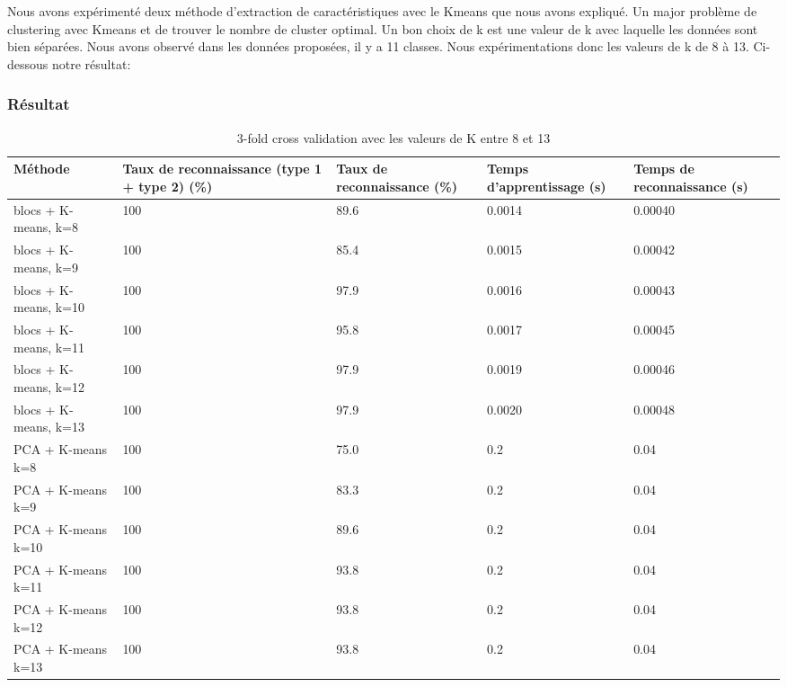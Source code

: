 \documentclass[french,12pt,a4paper,oneside,notitlepage]{report}
\begin{document}
Nous avons expérimenté deux méthode d'extraction de caractéristiques avec le Kmeans que nous avons expliqué. Un major problème de clustering avec Kmeans et de trouver le nombre de cluster optimal. Un bon choix de k est une valeur de k avec laquelle les données sont bien séparées. Nous avons observé dans les données proposées, il y a 11 classes. Nous expérimentations donc les valeurs de k de 8 à 13.
Ci-dessous notre résultat:

\subsubsection{Résultat}
\begin{table}[!ht]
  \begin{center}
	\begin{tabular}{|p{4cm}|p{2.5cm}|p{2.5cm}|p{2.7cm}|p{2.7cm}|}
	  \hline
	  Méthode & Taux de reconnaissance (type 1 + type 2) (\%) &  Taux de reconnaissance (\%) & Temps d'apprentissage (s) & Temps de reconnaissance (s)\\
	  \hline
	  blocs + K-means, k=8& 100 & 89.6 & 0.0014 & 0.00040\\
	  blocs + K-means, k=9& 100 & 85.4 & 0.0015 & 0.00042\\
	  blocs + K-means, k=10& 100 & 97.9 & 0.0016 & 0.00043\\
	  blocs + K-means, k=11& 100 & 95.8 & 0.0017 & 0.00045\\
	  blocs + K-means, k=12& 100 & 97.9 & 0.0019 & 0.00046\\
	  blocs + K-means, k=13& 100 & 97.9 & 0.0020 & 0.00048\\
	  PCA + K-means k=8& 100 & 75.0 & 0.2& 0.04\\
	  PCA + K-means k=9& 100 & 83.3 & 0.2& 0.04\\
	  PCA + K-means k=10& 100 & 89.6 & 0.2& 0.04\\
	  PCA + K-means k=11& 100 & 93.8 & 0.2& 0.04\\
	  PCA + K-means k=12& 100 & 93.8 & 0.2& 0.04\\
	  PCA + K-means k=13& 100 & 93.8 & 0.2& 0.04\\
	  \hline
	\end{tabular}
  \end{center}
  \caption{3-fold cross validation avec les valeurs de K entre 8 et 13}
\end{table}
\end{document}
